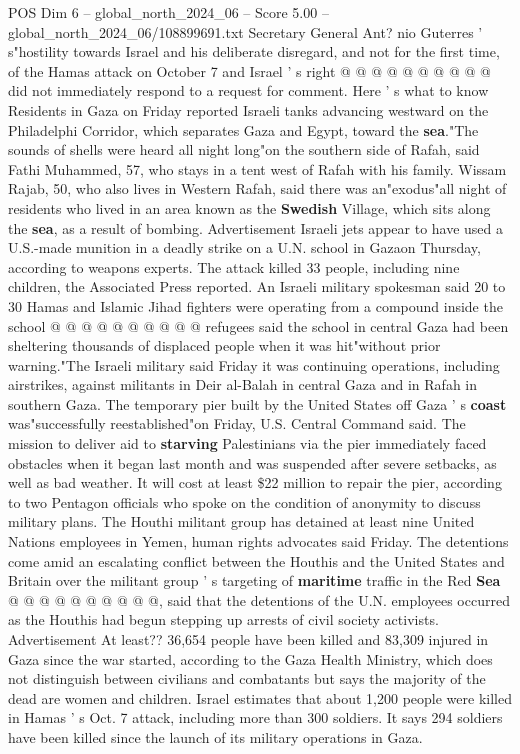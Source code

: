 \begin{textsample}{POS Dim 6 – global\_north\_2024\_06 – Score 5.00 – global\_north\_2024\_06/108899691.txt}
Secretary General Ant? nio Guterres ' s"hostility towards Israel and his deliberate disregard, and not for the first time, of the Hamas attack on October 7 and Israel ' s right @ @ @ @ @ @ @ @ @ @ did not immediately respond to a request for comment.
Here ' s what to know Residents in Gaza on Friday reported Israeli tanks advancing westward on the Philadelphi Corridor, which separates Gaza and Egypt, toward the \textbf{sea}."The sounds of shells were heard all night long"on the southern side of Rafah, said Fathi Muhammed, 57, who stays in a tent west of Rafah with his family.
Wissam Rajab, 50, who also lives in Western Rafah, said there was an"exodus"all night of residents who lived in an area known as the \textbf{Swedish} Village, which sits along the \textbf{sea}, as a result of bombing.
Advertisement Israeli jets appear to have used a U.S.-made munition in a deadly strike on a U.N. school in Gazaon Thursday, according to weapons experts.
The attack killed 33 people, including nine children, the Associated Press reported.
An Israeli military spokesman said 20 to 30 Hamas and Islamic Jihad fighters were operating from a compound inside the school @ @ @ @ @ @ @ @ @ @ refugees said the school in central Gaza had been sheltering thousands of displaced people when it was hit"without prior warning."The Israeli military said Friday it was continuing operations, including airstrikes, against militants in Deir al-Balah in central Gaza and in Rafah in southern Gaza.
The temporary pier built by the United States off Gaza ' s \textbf{coast} was"successfully reestablished"on Friday, U.S.
Central Command said.
The mission to deliver aid to \textbf{starving} Palestinians via the pier immediately faced obstacles when it began last month and was suspended after severe setbacks, as well as bad weather.
It will cost at least \$22 million to repair the pier, according to two Pentagon officials who spoke on the condition of anonymity to discuss military plans.
The Houthi militant group has detained at least nine United Nations employees in Yemen, human rights advocates said Friday.
The detentions come amid an escalating conflict between the Houthis and the United States and Britain over the militant group ' s targeting of \textbf{maritime} traffic in the Red \textbf{Sea} @ @ @ @ @ @ @ @ @ @, said that the detentions of the U.N. employees occurred as the Houthis had begun stepping up arrests of civil society activists.
Advertisement At least?? 36,654 people have been killed and 83,309 injured in Gaza since the war started, according to the Gaza Health Ministry, which does not distinguish between civilians and combatants but says the majority of the dead are women and children.
Israel estimates that about 1,200 people were killed in Hamas ' s Oct. 7 attack, including more than 300 soldiers.
It says 294 soldiers have been killed since the launch of its military operations in Gaza.

\end{textsample}
